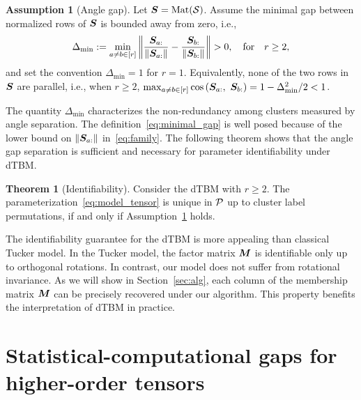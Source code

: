 \documentclass[lettersize,onecolumn,journal]{IEEEtran}
\theoremstyle{definition}
\newtheorem{thm}{Theorem}
\theoremstyle{definition}
\newtheorem{assumption}{Assumption}
\newcommand{\of}[1]{\left(#1\right)}
\begin{document}
\begin{assumption}[Angle gap] \label{assmp:min_gap}Let $\bm S = \text{Mat}(\mathcal{S})$. Assume the minimal gap between normalized rows of $\bm S$ is bounded away from zero, i.e.,
\begin{equation}\label{eq:minimal_gap}
    \Delta_{\min} := \min_{a \neq b \in [r]} \onorm{\frac{\mS_{a:}}{\onormSize{}{ \mS_{a:}}} - \frac{\mS_{b:}}{\onormSize{}{ \mS_{b:}}} }>0, \quad \text{for} \quad r \geq 2,
\end{equation}
and set the convention $\Delta_{\min} = 1$ for $r = 1$.
    Equivalently, none of the two rows in $\bm S$ are parallel, i.e., when $r \geq 2$, $ \max_{a \neq b\in [r]}\cos \of{\mS_{a:},\  \mS_{b:}}  = 1-\Delta^2_{\min}/2<1$.
\end{assumption}
The quantity $\Delta_{\min}$ characterizes the non-redundancy among clusters measured by angle separation. The definition~\eqref{eq:minimal_gap} is well posed because of the lower bound on $\left\lVert\bm S_{a:}\right\rVert$ in~\eqref{eq:family}. The following theorem shows that the angle gap separation is sufficient and necessary for parameter identifiability under dTBM. 

\begin{thm}[Identifiability]\label{thm:unique} Consider the dTBM with $r\geq 2$. The parameterization~\eqref{eq:model_tensor} is unique in $\mathcal{P}$ up to cluster label permutations, if and only if Assumption~\ref{assmp:min_gap} holds.
\end{thm}

The identifiability guarantee for the dTBM is more appealing than classical Tucker model. In the Tucker model, the factor matrix $\bm M$ is identifiable only up to orthogonal rotations. In contrast, our model does not suffer from rotational invariance. As we will show in Section~\ref{sec:alg}, each column of the membership matrix $\bm M$ can be precisely recovered under our algorithm. This property benefits the interpretation of dTBM in practice. 

\section{Statistical-computational gaps for higher-order tensors}\label{sec:limits}
\end{document}
